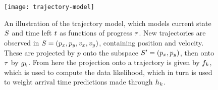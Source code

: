 \begin{figure}
  \centering
  \texttt{[image: trajectory-model]}
  \caption{An illustration of the trajectory model, which models
    current state $S$ and time left $t$ as functions of
    progress $\tau$. New trajectories are observed in 
    $S = (p_x, p_y, v_x, v_y)$, containing position and velocity. 
    These are projected by $p$ onto the subspace $S' = (p_x,
    p_y)$, then onto $\tau$ by $g_{k}$. From here the
    projection onto a trajectory is given by $f_{k}$, which is
    used to compute the data likelihood, which in turn is used to
    weight arrival time predictions made through $h_{k}$.}\label{fig:trajectory-model}
\end{figure}



